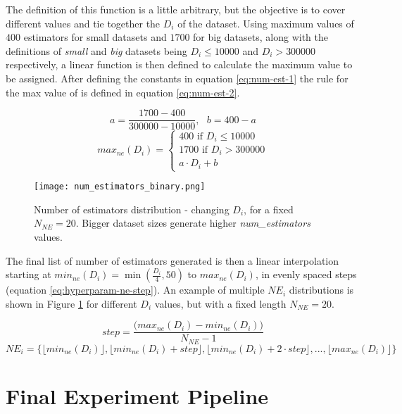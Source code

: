 The definition of this function is a little arbitrary, but the objective is to cover different values and tie together the $D_i$ of the dataset. Using maximum values of $400$ estimators for small datasets and $1700$ for big datasets, along with the definitions of \textit{small} and \textit{big} datasets being $D_i\leq10000$ and $D_i>300000$ respectively, a linear function is then defined to calculate the maximum value to be assigned. After defining the constants in equation \ref{eq:num-est-1} the rule for the max value of  is defined in equation \ref{eq:num-est-2}.

\begin{equation}
    a = \frac{1700 - 400}{300000 - 10000}, \text{ }b = 400 - a
    \label{eq:num-est-1}
\end{equation}
\begin{equation}
    max_{ne}(D_i) = \begin{cases}
        400 \text{ if } D_i \leq 10000 \\
        1700 \text{ if } D_i > 300000 \\
        a \cdot D_i + b
    \end{cases}
    \label{eq:num-est-2}
\end{equation}

\begin{figure}[H]
    \centering
    \texttt{[image: num\_estimators\_binary.png]} 
    \caption{Number of estimators distribution - changing $D_i$, for a fixed $N_{NE} = 20$. Bigger dataset sizes generate higher \textit{num\_estimators} values.}
    \label{fig:hyperparam-ne1}
\end{figure}

The final list of number of estimators generated is then a linear interpolation starting at $min_{ne}(D_i) = \min(\frac{D_i}{4}, 50)$ to $max_{ne}(D_i)$, in evenly spaced steps (equation \ref{eq:hyperparam-ne-step}). An example of multiple $NE_i$ distributions is shown in Figure \ref{fig:hyperparam-ne1} for different $D_i$ values, but with a fixed length $N_{NE} = 20$.

$$step = \frac{\Big(max_{ne}(D_i) - min_{ne}(D_i)\Big)}{N_{NE} - 1}$$
\begin{equation}
    NE_i = \Big\{\lfloor min_{ne}(D_i) \rfloor,\lfloor min_{ne}(D_i) + step \rfloor,\lfloor min_{ne}(D_i) + 2\cdot step \rfloor, ... ,\lfloor max_{ne}(D_i)\rfloor\Big\}
    \label{eq:hyperparam-ne-step}
\end{equation}

\section{Final Experiment Pipeline}

